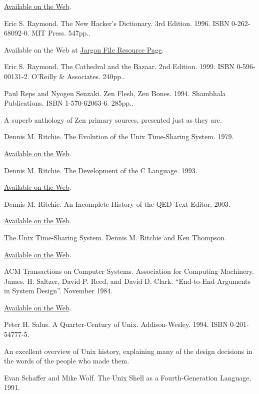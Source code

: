 \documentclass[12pt,oneside]{ctexbook}
\begin{document}
\begin{common-format}
\begin{thebibliography}{9}
\href{http://www.memorymanagement.org/}{Available on the Web}.

 Eric S. Raymond. The New Hacker's Dictionary. 3rd Edition. 1996. ISBN 0-262-68092-0. MIT Press. 547pp..

Available on the Web at \href{http://www.catb.org/~esr/jargon}{Jargon File Resource Page}.

 Eric S. Raymond. The Cathedral and the Bazaar. 2nd Edition. 1999. ISBN 0-596-00131-2. O'Reilly \&{} Associates. 240pp..

 Paul Reps and Nyogen Senzaki. Zen Flesh, Zen Bones. 1994. Shambhala Publications. ISBN 1-570-62063-6. 285pp..

A superb anthology of Zen primary sources, presented just as they are.

 Dennis M. Ritchie. The Evolution of the Unix Time-Sharing System. 1979.

\href{http://cm.bell-labs.com/cm/cs/who/dmr/hist.html}{Available on the Web}.

 Dennis M. Ritchie. The Development of the C Language. 1993.

\href{http://cm.bell-labs.com/cm/cs/who/dmr/chist.html}{Available on the Web}.

 Dennis M. Ritchie. An Incomplete History of the QED Text Editor. 2003.

\href{http://cm.bell-labs.com/cm/cs/who/dmr/qed.html}{Available on the Web}.

 The Unix Time-Sharing System. Dennis M. Ritchie and Ken Thompson.

\href{http://cm.bell-labs.com/cm/cs/who/dmr/cacm.html}{Available on the Web}.

 ACM Transactions on Computer Systems. Association for Computing Machinery. James. H. Saltzer, David P. Reed, and David D. Clark. “End-to-End Arguments in System Design”. November 1984.

\href{http://web.mit.edu/Saltzer/www/publications/endtoend/endtoend.pdf}{Available on the Web}.

 Peter H. Salus. A Quarter-Century of Unix. Addison-Wesley. 1994. ISBN 0-201-54777-5.

An excellent overview of Unix history, explaining many of the design decisions in the words of the people who made them.

 Evan Schaffer and Mike Wolf. The Unix Shell as a Fourth-Generation Language. 1991.


\end{thebibliography}
\end{common-format}
\end{document}
